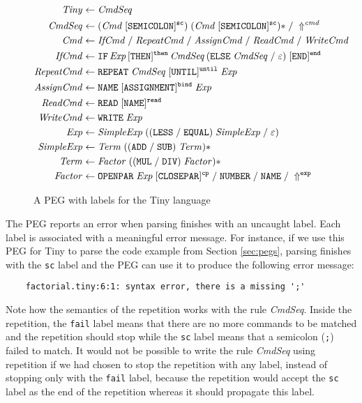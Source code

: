 \documentclass[3p,12pt,singlecolumn]{elsarticle}
\newcommand{\throw}{\Uparrow}
\begin{document}
\begin{figure}
\begin{align*}
\it{Tiny} & \leftarrow \it{CmdSeq}\\
\it{CmdSeq} & \leftarrow \it{(Cmd \; [{\tt SEMICOLON}]^{\tt sc}) \;
  (Cmd \; [{\tt SEMICOLON}]^{\tt sc})*} \; / \; \throw^{cmd}\\
\it{Cmd} & \leftarrow \it{IfCmd \; / \; RepeatCmd \; / \;
  AssignCmd \; / \; ReadCmd \; / \; WriteCmd}\\
\it{IfCmd} & \leftarrow \it{{\tt IF} \, Exp \,
  [{\tt THEN}]^{\tt then} \, CmdSeq \,
  ({\tt ELSE} \; CmdSeq \;/\; \varepsilon) \;
  [{\tt END}]^{\tt end}}\\
\it{RepeatCmd} & \leftarrow \it{{\tt REPEAT} \; CmdSeq \;
  [{\tt UNTIL}]^{\tt until} \; Exp}\\
\it{AssignCmd} & \leftarrow \it{{\tt NAME} \; [{\tt ASSIGNMENT}]^{\tt bind} \;
  Exp}\\
\it{ReadCmd} & \leftarrow \it{{\tt READ} \; [{\tt NAME}]^{\tt read}}\\
\it{WriteCmd} & \leftarrow \it{{\tt WRITE} \; Exp}\\
\it{Exp} & \leftarrow \it{SimpleExp \;
  (({\tt LESS} \; / \; {\tt EQUAL}) \; SimpleExp \; /
  \; \varepsilon})\\
\it{SimpleExp} & \leftarrow \it{Term \;
  (({\tt ADD} \; / \; {\tt SUB}) \; Term)*}\\
\it{Term} & \leftarrow \it{Factor \;
  (({\tt MUL} \; / \; {\tt DIV}) \; Factor)*}\\
\it{Factor} & \leftarrow \it{{\tt OPENPAR} \; Exp
  \; [{\tt CLOSEPAR}]^{\tt cp} \; /
  \; {\tt NUMBER} \; / \; {\tt NAME}} \; / \; \throw^{\tt exp}
\end{align*}
\caption{A PEG with labels for the Tiny language}
\label{fig:tinylabels}
\end{figure}

The PEG reports an error when parsing finishes with an
uncaught label. Each label is associated with a
meaningful error message.
For instance, if we use this PEG for Tiny to parse the
code example from Section \ref{sec:pegs}, parsing finishes with the
\texttt{sc} label and the PEG can use it to produce the following
error message:

\begin{verbatim}
    factorial.tiny:6:1: syntax error, there is a missing ';'
\end{verbatim}

Note how the semantics of the repetition works with the rule
\textit{CmdSeq}.
Inside the repetition, the \texttt{fail} label means that there are no
more commands to be matched and the repetition should stop while the
\texttt{sc} label means that a semicolon (\texttt{;}) failed to match.
It would not be possible to write the rule \textit{CmdSeq}
using repetition if we had chosen to stop the repetition with any
label, instead of stopping only with the \texttt{fail} label,
because the repetition would accept the \texttt{sc} label as the
end of the repetition whereas it should propagate this label.
\end{document}
